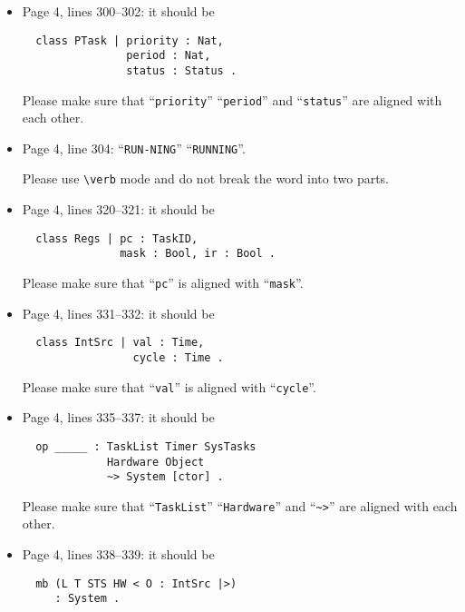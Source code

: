 \documentclass[12pt,onecolumn]{IEEEtranTIE}
\begin{document}
\begin{itemize}
Please make sure that this kind of code throughout the article is put
in \verb|\verb| mode. (We are not sure whether it is true because
``\verb+|+'' look a bit higher and ``\verb|>|'' look a bit wider than
what they should be.)

\item Page 4, lines 300--302: it should be
\begin{verbatim}
  class PTask | priority : Nat, 
                period : Nat, 
                status : Status .
\end{verbatim}

Please make sure that ``\verb|priority|'' ``\verb|period|'' and
``\verb|status|'' are aligned with each other.

\item Page 4, line 304: ``\verb|RUN-NING|'' \by ``\verb|RUNNING|''.

Please use \verb|\verb| mode and do not break the word into two parts.

\item Page 4, lines 320--321: it should be
\begin{verbatim}
  class Regs | pc : TaskID, 
               mask : Bool, ir : Bool .
\end{verbatim}

Please make sure that ``\verb|pc|'' is aligned with ``\verb|mask|''.

\item Page 4, lines 331--332: it should be
\begin{verbatim}
  class IntSrc | val : Time, 
                 cycle : Time .
\end{verbatim}

Please make sure that ``\verb|val|'' is aligned with ``\verb|cycle|''.

\item Page 4, lines 335--337: it should be
\begin{verbatim}
  op _____ : TaskList Timer SysTasks 
             Hardware Object 
             ~> System [ctor] .
\end{verbatim}

Please make sure that ``\verb|TaskList|'' ``\verb|Hardware|'' and
``\verb|~>|'' are aligned with each other.


\item Page 4, lines 338--339: it should be
\begin{verbatim}
  mb (L T STS HW < O : IntSrc |>) 
     : System .
\end{verbatim}


\end{itemize}
\end{document}
